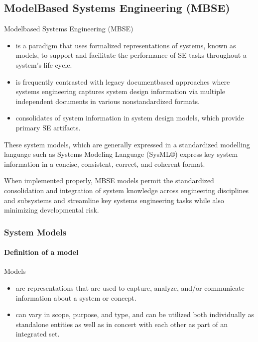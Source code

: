 \documentclass[letterpaper,10pt,english]{jupyterBook}
\begin{document}
\subsection{Model\sphinxhyphen{}Based Systems Engineering (MBSE)}
\label{\detokenize{SE/sebok:model-based-systems-engineering-mbse}}
\sphinxAtStartPar
Model\sphinxhyphen{}based Systems Engineering (MBSE)
\begin{itemize}
\item {} 
\sphinxAtStartPar
is a paradigm that uses formalized representations of systems, known as models, to support and facilitate the performance of SE tasks throughout a system’s life cycle.

\item {} 
\sphinxAtStartPar
is frequently contrasted with legacy document\sphinxhyphen{}based approaches where systems engineering captures system design information via multiple independent documents in various non\sphinxhyphen{}standardized formats.

\item {} 
\sphinxAtStartPar
consolidates of system information in system design models, which provide primary SE artifacts.

\end{itemize}

\sphinxAtStartPar
These system models, which are generally expressed in a standardized modelling language such as Systems Modeling Language (SysML®) express key system information in a concise, consistent, correct, and coherent format.

\sphinxAtStartPar
When implemented properly, MBSE models permit the standardized consolidation and integration of system knowledge across engineering disciplines and subsystems and streamline key systems engineering tasks while also minimizing developmental risk.


\subsubsection{System Models}
\label{\detokenize{SE/sebok:system-models}}

\paragraph{Definition of a model}
\label{\detokenize{SE/sebok:definition-of-a-model}}
\sphinxAtStartPar
Models
\begin{itemize}
\item {} 
\sphinxAtStartPar
are representations that are used to capture, analyze, and/or communicate information about a system or concept.

\item {} 
\sphinxAtStartPar
can vary in scope, purpose, and type, and can be utilized both individually as stand\sphinxhyphen{}alone entities as well as in concert with each other as part of an integrated set.

\end{itemize}
\end{document}
